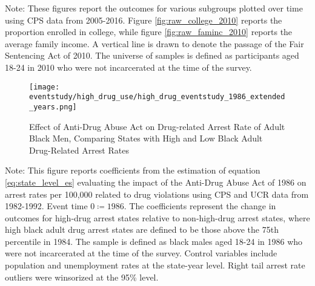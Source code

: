   \begin{footnotesize}
    \noindent Note: These figures report the outcomes for various subgroups plotted over time using CPS data from 2005-2016. Figure \ref{fig:raw_college_2010} reports the proportion enrolled in college, while figure \ref{fig:raw_faminc_2010} reports the average family income. A vertical line is drawn to denote the passage of the Fair Sentencing Act of 2010. The universe of samples is defined as participants aged 18-24 in 2010 who were not incarcerated at the time of the survey.
  \end{footnotesize}

  \clearpage

  \begin{figure}[h]
    \caption{Effect of Anti-Drug Abuse Act on Drug-related Arrest Rate of Adult Black Men, Comparing States with High and Low Black Adult Drug-Related Arrest Rates}
    \centering
    \texttt{[image: eventstudy/high\_drug\_use/high\_drug\_eventstudy\_1986\_extended\_years.png]}
    \label{fig:b1}
  \end{figure}
  \begin{footnotesize}
    \noindent Note: This figure reports coefficients from the estimation of equation \ref{eq:state_level_es} evaluating the impact of the Anti-Drug Abuse Act of 1986 on arrest rates per 100,000 related to drug violations using CPS and UCR data from 1982-1992. Event time $0 \coloneqq 1986$. The coefficients represent the change in outcomes for high-drug arrest states relative to non-high-drug arrest states, where high black adult drug arrest states are defined to be those above the 75th percentile in 1984. The sample is defined as black males aged 18-24 in 1986 who were not incarcerated at the time of the survey. Control variables include population and unemployment rates at the state-year level. Right tail arrest rate outliers were winsorized at the 95\% level.
  \end{footnotesize}


